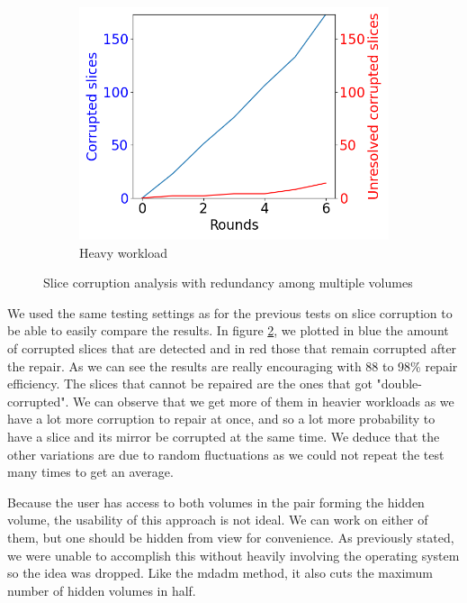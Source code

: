 \documentclass[a4paper,11pt,oneside]{report}
\begin{document}
\begin{figure}[ht]
     \hfill
     \begin{subfigure}[b]{0.3\textwidth}
         \centering
         \includegraphics[width=\textwidth]{Figures/mitigated_corruption_rate_3MB.png}
         \caption{Heavy workload}
         \label{fig:among_mitigated_slice_heavy}
     \end{subfigure}
        \caption{Slice corruption analysis with redundancy among multiple volumes}
        \label{fig:among_mitigated_slice_analysis}
\end{figure}

We used the same testing settings as for the previous tests on slice corruption to be able to easily compare the results. In figure \ref{fig:among_mitigated_slice_analysis}, we plotted in blue the amount of corrupted slices that are detected and in red those that remain corrupted after the repair. As we can see the results are really encouraging with 88 to 98\% repair efficiency. The slices that cannot be repaired are the ones that got "double-corrupted". We can observe that we get more of them in heavier workloads as we have a lot more corruption to repair at once, and so a lot more probability to have a slice and its mirror be corrupted at the same time. We deduce that the other variations are due to random fluctuations as we could not repeat the test many times to get an average. 

Because the user has access to both volumes in the pair forming the hidden volume, the usability of this approach is not ideal. We can work on either of them, but one should be hidden from view for convenience. As previously stated, we were unable to accomplish this without heavily involving the operating system so the idea was dropped. Like the mdadm method, it also cuts the maximum number of hidden volumes in half.
\end{document}
